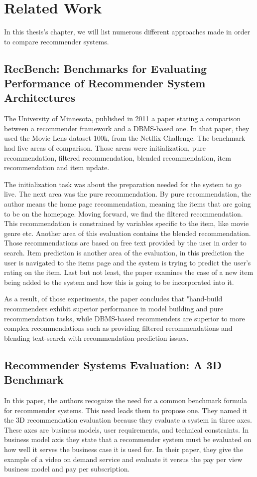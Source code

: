 \section{Related Work}
In this thesis's chapter, we will list numerous different approaches made in order to compare recommender systems.

\subsection{RecBench: Benchmarks for Evaluating Performance of Recommender System Architectures \cite{levandoski2011recbench}}
The University of Minnesota, published in 2011 a paper stating a comparison between a recommender framework and a DBMS-based one. In that paper, they used the Movie Lens dataset 100k, from the Netflix Challenge. The benchmark had five areas of comparison. Those areas were initialization, pure recommendation, filtered recommendation, blended recommendation, item recommendation and item update.

The initialization task was about the preparation needed for the system to go live. The next area was the pure recommendation. By pure recommendation, the author means the home page recommendation, meaning the items that are going to be on the homepage. Moving forward, we find the filtered recommendation. This recommendation is constrained by variables specific to the item, like movie genre etc. Another area of this evaluation contains the blended recommendation. Those recommendations are based on free text provided by the user in order to search. Item prediction is another area of the evaluation, in this prediction the user is navigated to the items page and the system is trying to predict the user's rating on the item. Last but not least, the paper examines the case of a new item being added to the system and how this is going to be incorporated into it.

As a result, of those experiments, the paper concludes that "hand-build recommenders exhibit superior performance in model building and pure recommendation tasks, while DBMS-based recommenders are superior to more complex recommendations such as providing filtered recommendations and blending text-search with recommendation prediction issues.

\subsection{Recommender Systems Evaluation: A 3D Benchmark \cite{said2012recommender}}
In this paper, the authors recognize the need for a common benchmark formula for recommender systems. This need leads them to propose one. They named it the 3D recommendation evaluation because they evaluate a system in three axes. These axes are business models, user requirements, and technical constraints. In business model axis they state that a recommender system must be evaluated on how well it serves the business case it is used for. In their paper, they give the example of a video on demand service and evaluate it versus the pay per view business model and pay per subscription.

